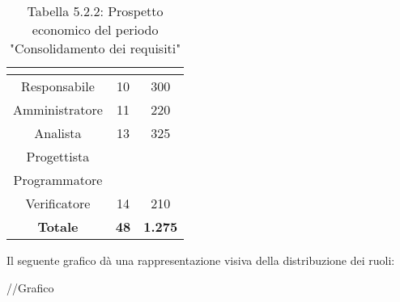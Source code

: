 \renewcommand{\arraystretch}{1.5}
\begin{table}[H]
\begin{center}
\begin{tabular}{|c|c|c|}
\hline
\rowcolor{title_row}
\textbf{\color{title_text}{Ruolo}}  & \textbf{\color{title_text}{Ore}} & \textbf{\color{title_text}{Costo in \euro}} \\ \hline
Responsabile    & 10 & 300 \\ \hline
Amministratore  & 11 & 220 \\ \hline
Analista        & 13 & 325 \\ \hline
Progettista     & & \\ \hline
Programmatore   & & \\ \hline
Verificatore    & 14 & 210 \\ \hline
\textbf{Totale} & \textbf{48}    & \textbf{1.275}    \\ \hline
\end{tabular}
\caption{Tabella 5.2.2: Prospetto economico del periodo "Consolidamento dei requisiti"\label{}}
\end{center}
\end{table}
\renewcommand{\arraystretch}{1}

Il seguente grafico dà una rappresentazione visiva della distribuzione dei ruoli: \\
\begin{center}
//Grafico
\end{center}

\pagebreak